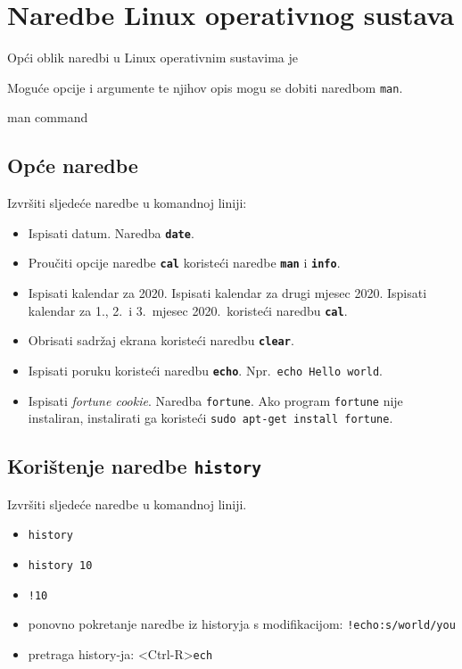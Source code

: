 \section{Naredbe Linux operativnog sustava}
Opći oblik naredbi u Linux operativnim sustavima je
Moguće opcije i argumente te njihov opis mogu se dobiti naredbom \lstinline!man!.
\begin{prototip}
man command 
\end{prototip}


\subsection*{Opće naredbe}
\begin{zadatak}
Izvršiti sljedeće naredbe u komandnoj liniji:
\begin{itemize}
\item Ispisati datum. Naredba \textbf{\texttt{date}}.
\item Proučiti opcije naredbe \textbf{\texttt{cal}} koristeći naredbe \textbf{\texttt{man}} i \textbf{\texttt{info}}.
\item Ispisati kalendar za 2020. Ispisati kalendar za drugi mjesec 2020. Ispisati kalendar za 1., 2.~i 3.~mjesec 2020.~koristeći naredbu \textbf{\texttt{cal}}.
\item Obrisati sadržaj ekrana koristeći naredbu \textbf{\texttt{clear}}.
\item Ispisati poruku koristeći naredbu \textbf{\texttt{echo}}. Npr.~\texttt{echo Hello world}.
\item Ispisati \textit{fortune cookie}. Naredba \texttt{fortune}. Ako program \lstinline!fortune! nije instaliran, instalirati ga koristeći \lstinline!sudo apt-get install fortune!. 
\end{itemize}
\end{zadatak}
\subsection*{Korištenje naredbe \texttt{history}}
\begin{zadatak}
Izvršiti sljedeće naredbe u komandnoj liniji.
\begin{itemize}
\item \texttt{history}
\item \texttt{history 10}
\item \texttt{!10}
\item ponovno pokretanje naredbe iz historyja s modifikacijom: \texttt{!echo:s/world/you}
\item pretraga history-ja: <Ctrl-R>\texttt{ech}
\end{itemize}
\end{zadatak}
